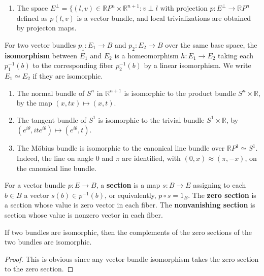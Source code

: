 \begin{exmp}
\begin{enumerate}
\item The space $E^\perp=\{(l,v)\in \mathbb{R}P^n\times \mathbb{R}^{n+1}:v\perp l$ with projection $p:E^\perp \rightarrow \mathbb{R}P^n$ defined as $p(l,v)$ is a vector bundle, and local trivializations are obtained by projecton maps.
\end{enumerate}
\end{exmp}

\begin{defn} For two vector bundles $p_1:E_1\rightarrow B$ and $p_2:E_2\rightarrow B$ over the same base space, the \textbf{isomorphism} between $E_1$ and $E_2$ is a homeomorphism $h:E_1\rightarrow E_2$ taking each $p_1^{-1}(b)$ to the corresponding fiber $p_2^{-1}(b)$ by a linear isomorphism. We write $E_1\simeq E_2$ if they are isomorphic.
\end{defn}

\begin{exmp}
\begin{enumerate}
\item The normal bundle of $S^n$ in $\mathbb{R}^{n+1}$ is isomorphic to the product bundle $S^n\times \mathbb{R}$, by the map $(x,tx)\mapsto (x,t)$.
\item The tangent bundle of $S^1$ is isomorphic to the trivial bundle $S^1\times \mathbb{R}$, by $(e^{i\theta},ite^{i\theta})\mapsto (e^{i\theta},t)$.
\item The M{\"o}bius bundle is isomorphic to the canonical line bundle over $\mathbb{R}P^1\simeq S^1$. Indeed, the line on angle $0$ and $\pi$ are identified, with $(0,x)\approx (\pi,-x)$, on the canonical line bundle.
\end{enumerate}
\end{exmp}

\begin{defn} For a vector bundle $p:E\rightarrow B$, a \textbf{section} is a map $s:B\rightarrow E$ assigning to each $b\in B$ a vector $s(b)\in p^{-1}(b)$, or equivalently, $p\circ s=1_B$. The \textbf{zero section} is a section whose value is zero vector in each fiber. The \textbf{nonvanishing section} is section whose value is nonzero vector in each fiber.
\end{defn}

\begin{prop} If two bundles are isomorphic, then the complements of the zero sections of the two bundles are isomorphic.
\end{prop}
\begin{proof}
This is obvious since any vector bundle isomorphism takes the zero section to the zero section.
\end{proof}

